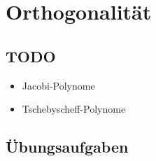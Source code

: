 %
%
%
\chapter{Orthogonalität
\label{buch:chapter:orthogonalitaet}}
\rhead{}








\section{TODO}
\begin{itemize}
\item Jacobi-Polynome
\item Tschebyscheff-Polynome
\end{itemize}

\section*{Übungsaufgaben}
\begin{uebungsaufgaben}
\end{uebungsaufgaben}


